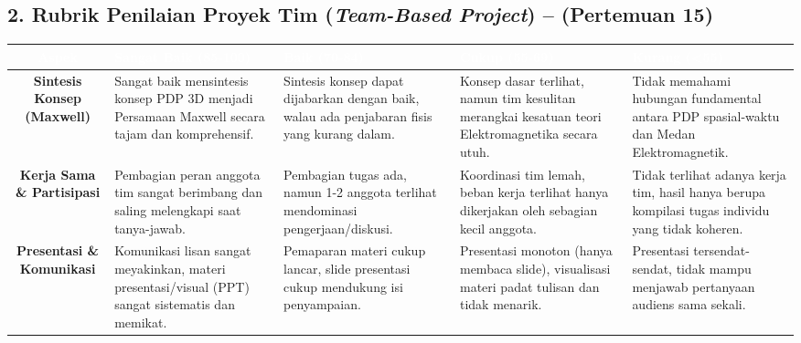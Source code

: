\documentclass[11pt,a4paper]{article}
\begin{document}
\subsection*{2. Rubrik Penilaian Proyek Tim (\textit{Team-Based Project}) -- (Pertemuan 15)}
\begin{table}[h]
\centering
\begin{tabularx}{\textwidth}{|c|X|X|X|X|}
\hline
\rowcolor{unibblue}
\textcolor{white}{\textbf{Aspek}} & \textcolor{white}{\textbf{Sangat Baik (85-100)}} & \textcolor{white}{\textbf{Baik (70-84)}} & \textcolor{white}{\textbf{Cukup (55-69)}} & \textcolor{white}{\textbf{Kurang (<55)}} \\ \hline
\textbf{Sintesis Konsep (Maxwell)} & Sangat baik mensintesis konsep PDP 3D menjadi Persamaan Maxwell secara tajam dan komprehensif. & Sintesis konsep dapat dijabarkan dengan baik, walau ada penjabaran fisis yang kurang dalam. & Konsep dasar terlihat, namun tim kesulitan merangkai kesatuan teori Elektromagnetika secara utuh. & Tidak memahami hubungan fundamental antara PDP spasial-waktu dan Medan Elektromagnetik. \\ \hline
\textbf{Kerja Sama \& Partisipasi} & Pembagian peran anggota tim sangat berimbang dan saling melengkapi saat tanya-jawab. & Pembagian tugas ada, namun 1-2 anggota terlihat mendominasi pengerjaan/diskusi. & Koordinasi tim lemah, beban kerja terlihat hanya dikerjakan oleh sebagian kecil anggota. & Tidak terlihat adanya kerja tim, hasil hanya berupa kompilasi tugas individu yang tidak koheren. \\ \hline
\textbf{Presentasi \& Komunikasi} & Komunikasi lisan sangat meyakinkan, materi presentasi/visual (PPT) sangat sistematis dan memikat. & Pemaparan materi cukup lancar, slide presentasi cukup mendukung isi penyampaian. & Presentasi monoton (hanya membaca slide), visualisasi materi padat tulisan dan tidak menarik. & Presentasi tersendat-sendat, tidak mampu menjawab pertanyaan audiens sama sekali. \\ \hline
\end{tabularx}
\end{table}

\vspace{0.5cm}
\end{document}
